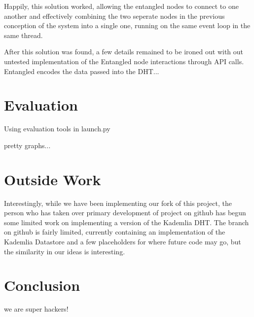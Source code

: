 \documentclass[12pt,twocolumn]{article}
\begin{document}
Happily, this solution worked, allowing the entangled nodes to connect to one another and effectively combining the two seperate nodes in the previous conception of the system into a single one, running on the same event loop in the same thread.

After this solution was found, a few details remained to be ironed out with out untested implementation of the Entangled node interactions through API calls. Entangled encodes the data passed into the DHT...

\section{Evaluation}
Using evaluation tools in launch.py

pretty graphs...


\section{Outside Work}
Interestingly, while we have been implementing our fork of this project, the person who has taken over primary development of project on github has begun some limited work on implementing a version of the Kademlia DHT. The branch on github is fairly limited, currently containing an implementation of the Kademlia Datastore and a few placeholders for where future code may go, but the similarity in our ideas is interesting.

\section{Conclusion}

we are super hackers!
\end{document}
